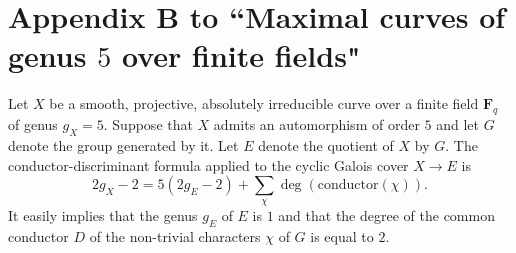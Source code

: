 

\newcommand{\QQ}{\mathbf{Q}}
\newcommand{\ZZ}{\mathbf{Z}}
\newcommand{\FF}{\mathbf{F}}
\newcommand{\HH}{\mathbf{H}}
\newcommand{\RR}{\mathbf{R}}
\newcommand{\CC}{\mathbf{C}}
\newcommand{\PP}{\mathbf{P}}

\renewcommand{\AA}{\mathbf{A}}

\newcommand{\abs}[1]{\lvert\!\lvert #1 \rvert\!\rvert}
\newcommand{\zmod}[1]{\,\,(\mathrm{mod}\,\,#1)}
\newcommand{\Gal}{\mathrm{Gal}}
\newcommand{\pp}{\mathfrak{p}}
\newcommand{\qq}{\mathfrak{q}}
\newcommand{\ga}{J_{\pi}}
\newcommand{\gb}{J_{\pi'}}
\newcommand{\onto}{\twoheadrightarrow}

\newcommand{\Sref}{1}
\newcommand{\Zref}{2}

\newtheorem{proposition}{Proposition}
\renewcommand{\theproposition}{B.\arabic{proposition}}

\newtheorem{corollary}[proposition]{Corollary}


%


\section*{Appendix B to ``Maximal curves of genus $5$ over finite fields"} \label{appendix B}

Let $X$ be a smooth, projective, absolutely irreducible curve over a finite field
$\FF_q$ of genus $g_X=5$. Suppose that $X$ admits an automorphism of order $5$
and let $G$ denote the group generated by it. Let $E$ denote the quotient of $X$
by $G$. The conductor-discriminant formula applied to the cyclic Galois cover
$X \rightarrow E$ is
\[2g_X - 2 = 5(2g_E - 2)+\sum_{\chi} \deg(\mathrm{conductor}(\chi)).
\]
It easily implies that the genus $g_E$ of $E$ is $1$ and that the degree of the
common conductor $D$ of the non-trivial characters $\chi$ of $G$ is equal to $2$.

